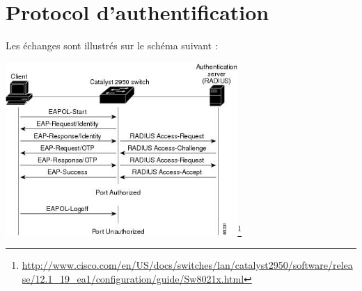 \newpage
\section{Protocol d'authentification}

Les échanges sont illustrés sur le schéma suivant :\\
\begin{center}
\includegraphics[width=250pt]{img/authentification.jpg}\footnote{\url{http://www.cisco.com/en/US/docs/switches/lan/catalyst2950/software/release/12.1_19_ea1/configuration/guide/Sw8021x.html}}
\end{center}


